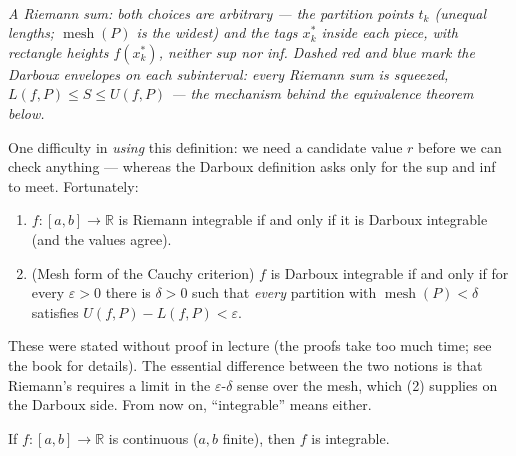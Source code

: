 \documentclass[11pt]{report}
\newcommand{\figcap}[1]{\\[1.5mm]\parbox{0.92\textwidth}{\small\itshape #1}}
\begin{document}
\begin{center}
\figcap{A Riemann sum: both choices are arbitrary --- the partition points $t_k$ (unequal lengths; $\operatorname{mesh}(P)$ is the widest) and the tags $x_k^*$ inside each piece, with rectangle heights $f(x_k^*)$, neither sup nor inf. Dashed red and blue mark the Darboux envelopes on each subinterval: every Riemann sum is squeezed, $L(f,P) \leq S \leq U(f,P)$ --- the mechanism behind the equivalence theorem below.}
\end{center}


One difficulty in \emph{using} this definition: we need a candidate value $r$ before we can check anything --- whereas the Darboux definition asks only for the sup and inf to meet. Fortunately:

\begin{thmbox}
\begin{enumerate}[label=(\arabic*)]
    \item $f: [a,b] \to \mathbb{R}$ is Riemann integrable if and only if it is Darboux integrable (and the values agree).
    \item (Mesh form of the Cauchy criterion) $f$ is Darboux integrable if and only if for every $\varepsilon > 0$ there is $\delta > 0$ such that \emph{every} partition with $\operatorname{mesh}(P) < \delta$ satisfies $U(f,P) - L(f,P) < \varepsilon$.
\end{enumerate}
\end{thmbox}

These were stated without proof in lecture (the proofs take too much time; see the book for details). The essential difference between the two notions is that Riemann's requires a limit in the $\varepsilon$-$\delta$ sense over the mesh, which (2) supplies on the Darboux side. From now on, ``integrable'' means either.

\begin{thmbox}
If $f: [a,b] \to \mathbb{R}$ is continuous ($a, b$ finite), then $f$ is integrable.
\end{thmbox}
\end{document}
